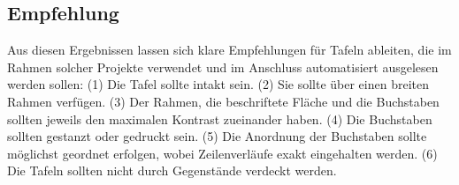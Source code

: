 \subsection{Empfehlung}
Aus diesen Ergebnissen lassen sich klare Empfehlungen für Tafeln ableiten, die im Rahmen solcher Projekte verwendet und im Anschluss automatisiert ausgelesen werden sollen: (1) Die Tafel sollte intakt sein. (2) Sie sollte über einen breiten Rahmen verfügen. (3) Der Rahmen, die beschriftete Fläche und die Buchstaben sollten jeweils den maximalen Kontrast zueinander haben. (4) Die Buchstaben sollten gestanzt oder gedruckt sein. (5) Die Anordnung der Buchstaben sollte möglichst geordnet erfolgen, wobei Zeilenverläufe exakt eingehalten werden. (6) Die Tafeln sollten nicht durch Gegenstände verdeckt werden.